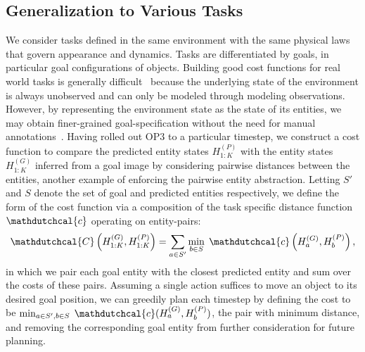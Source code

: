 \subsection{Generalization to Various Tasks} \label{sec:cost_function}
We consider tasks defined in the same environment with the same physical laws that govern appearance and dynamics.
Tasks are differentiated by goals, in particular goal configurations of objects.
Building good cost functions for real world tasks is generally difficult~\citep{fu2018variational} because the underlying state of the environment is always unobserved and can only be modeled through modeling observations.
However, by representing the environment state as the state of its entities, we may obtain finer-grained goal-specification without the need for manual annotations~\citep{ebert2018visual}.
Having rolled out OP3 to a particular timestep, we construct a cost function to compare the predicted entity states $H_{1:K}^{(P)}$ with the entity states $H_{1:K}^{(G)}$ inferred from a goal image by considering pairwise distances between the entities, another example of enforcing the pairwise entity abstraction.
Letting $S'$ and $S$ denote the set of goal and predicted entities respectively, we define the form of the cost function via a composition of the task specific distance function $\mathdutchcal{c}$ operating on entity-pairs:
\footnotesize
\begin{equation}
    \mathdutchcal{C}\left(H_{1:K}^{(G)}, H_{1:K}^{(P)}\right) = \sum_{a \in S'} \min_{b \in S} \; \mathdutchcal{c}\left(H_{a}^{(G)}, H_{b}^{(P)}\right),
\end{equation}
\normalsize
in which we pair each goal entity with the closest predicted entity and sum over the costs of these pairs.
Assuming a single action suffices to move an object to its desired goal position, we can greedily plan each timestep by defining the cost to be $\min_{a \in S', b \in S} \; \mathdutchcal{c}(H_{a}^{(G)}, H_{b}^{(P)})$, the pair with minimum distance, and removing the corresponding goal entity from further consideration for future planning.